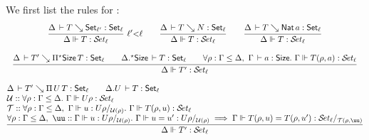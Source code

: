 \documentclass[acmlarge,review,anonymous]{acmart}\settopmatter{printfolios=true}
\begin{document}
We first list the rules for :
\begin{gather*}
  \rux{\Delta \der T \evalsto \Set[\ell'] : \Set[\ell]
     }{\sty \Delta T \ell
     }{\ell' {<} \ell}
\qquad
  \ru{\Delta \der T \evalsto N : \Set[\ell]
    }{\sty \Delta T \ell}
\qquad
  \ru{\Delta \der T \evalsto \Nat a : \Set[\ell]
    }{\sty \Delta T \ell}
\\[2ex]
  \rul{\Delta \der T' \evalsto \epiT \Size T : \Set[\ell] \qquad
       \eext \Delta \Size \der T : \Set[\ell] \qquad
      \forall \rho : \Gamma \leq \Delta,~\Gamma \der a : \Size.~
        \sty \Gamma {T(\rho,a)} \ell \\
    }{\sty \Delta {T'} \ell}
\\[2ex]
  \rul{\Delta \der T' \evalsto \piT U T : \Set[\ell] \qquad \cext \Delta U \der T : \Set[\ell] \\ \relax
      \U :: \forall \rho : \Gamma \leq \Delta.~ \sty{\Gamma}{U\rho} {\ell} \\ \relax
      \T :: \forall \rho : \Gamma \leq \Delta,~\sttmd \Gamma u {U\rho} {\U(\rho)}.~
        \sty \Gamma {T(\rho,u)} \ell \\
      \forall \rho : \Gamma \leq \Delta,~ \uu :: \sttmd \Gamma u {U\rho} {\U(\rho)}.~
        \sttmeqd \Gamma u {u'} {U\rho} {\U(\rho)} {\uu} \implies
        \steqd \Gamma {T(\rho,u)} {T(\rho,u')} \ell {\T(\rho,\uu)}
    }{\sty \Delta {T'} \ell}
\end{gather*}
\end{document}
